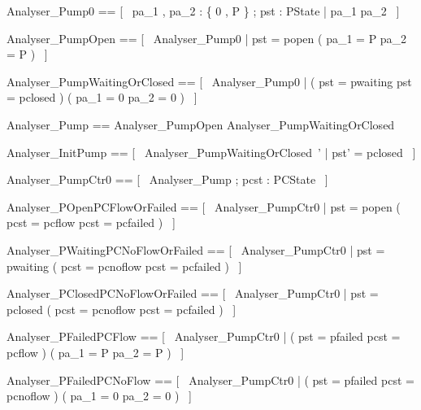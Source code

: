 \documentclass{article}
\begin{document}
\begin{zed}
	Analyser\_Pump0 == [~  pa\_1 , pa\_2 : \{ 0 , P \} ; pst : PState | pa\_1 \leq pa\_2  ~]
\end{zed}

\begin{zed}
	Analyser\_PumpOpen == [~  Analyser\_Pump0 | pst = popen \implies ( pa\_1 = P \land pa\_2 = P )  ~]
\end{zed}

\begin{zed}
	Analyser\_PumpWaitingOrClosed == [~  Analyser\_Pump0 | ( pst = pwaiting \lor pst = pclosed ) \implies ( pa\_1 = 0 \land pa\_2 = 0 )  ~]
\end{zed}

\begin{zed}
	Analyser\_Pump == Analyser\_PumpOpen \land Analyser\_PumpWaitingOrClosed
\end{zed}

\begin{zed}
	Analyser\_InitPump == [~  Analyser\_PumpWaitingOrClosed~' | pst' = pclosed  ~]
\end{zed}

\begin{zed}
	Analyser\_PumpCtr0 == [~  Analyser\_Pump ; pcst : PCState  ~]
\end{zed}

\begin{zed}
	Analyser\_POpenPCFlowOrFailed == [~  Analyser\_PumpCtr0 | pst = popen \implies ( pcst = pcflow \lor pcst = pcfailed )  ~]
\end{zed}

\begin{zed}
	Analyser\_PWaitingPCNoFlowOrFailed == [~  Analyser\_PumpCtr0 | pst = pwaiting \implies ( pcst = pcnoflow \lor pcst = pcfailed )  ~]
\end{zed}

\begin{zed}
	Analyser\_PClosedPCNoFlowOrFailed == [~  Analyser\_PumpCtr0 | pst = pclosed \implies ( pcst = pcnoflow \lor pcst = pcfailed )  ~]
\end{zed}

\begin{zed}
	Analyser\_PFailedPCFlow == [~  Analyser\_PumpCtr0 | ( pst = pfailed \land pcst = pcflow ) \implies ( pa\_1 = P \land pa\_2 = P )  ~]
\end{zed}

\begin{zed}
	Analyser\_PFailedPCNoFlow == [~  Analyser\_PumpCtr0 | ( pst = pfailed \land pcst = pcnoflow ) \implies ( pa\_1 = 0 \land pa\_2 = 0 )  ~]
\end{zed}
\end{document}
